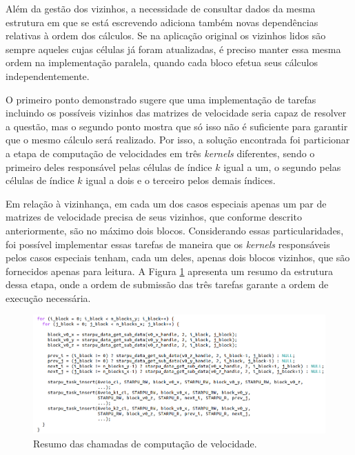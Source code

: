 \documentclass[cic,tc]{iiufrgs}
\begin{document}
Além da gestão dos vizinhos, a necessidade de consultar dados da mesma estrutura em que se está escrevendo adiciona também novas
dependências relativas à ordem dos cálculos. Se na aplicação original os vizinhos lidos são sempre aqueles cujas células já
foram atualizadas, é preciso manter essa mesma ordem na implementação paralela, quando cada bloco efetua seus cálculos independentemente.

O primeiro ponto demonstrado sugere que uma implementação de tarefas incluindo os possíveis vizinhos das matrizes de velocidade
seria capaz de resolver a questão, mas o segundo ponto mostra que só isso não é suficiente para garantir que o mesmo cálculo será
realizado. Por isso, a solução encontrada foi particionar a etapa de computação de velocidades em três \textit{kernels} diferentes, sendo
o primeiro deles responsável pelas células de índice $k$ igual a um, o segundo pelas células de índice $k$ igual a dois e o terceiro pelos
demais índices.

Em relação à vizinhança, em cada um dos casos especiais apenas um par de matrizes de velocidade precisa de seus vizinhos, que conforme
descrito anteriormente, são no máximo dois blocos. Considerando essas particularidades, foi possível implementar essas tarefas de
maneira que os \textit{kernels} responsáveis pelos casos especiais tenham, cada um deles, apenas dois blocos vizinhos, que são fornecidos
apenas para leitura. A Figura \ref{fig:kernels_velo} apresenta um resumo da estrutura dessa etapa, onde a ordem de submissão das três
tarefas garante a ordem de execução necessária.

\begin{figure}[!htb]
  \caption{Resumo das chamadas de computação de velocidade.}
    \begin{center} 
      \includegraphics[width=35em]{kernels_velo}
    \end{center}
    \label{fig:kernels_velo}
\end{figure}
\end{document}
